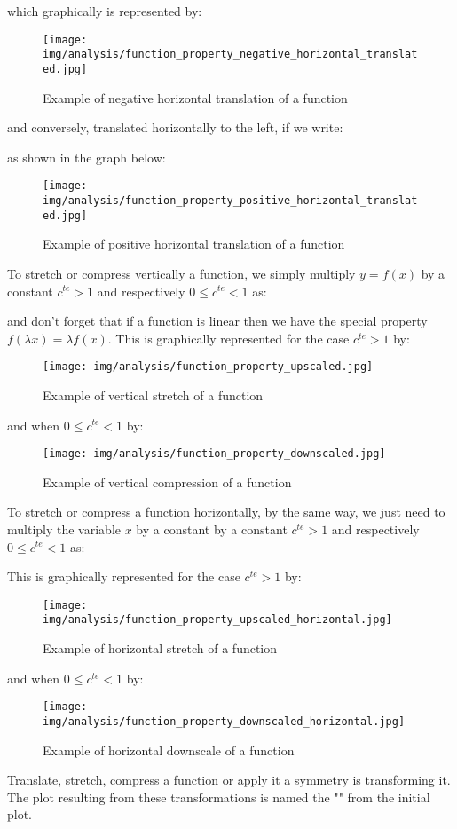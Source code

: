 \begin{enumerate}
		which graphically is represented by:
		\begin{figure}[H]
		\centering
		\texttt{[image: img/analysis/function\_property\_negative\_horizontal\_translated.jpg]}
		\caption{Example of negative horizontal translation of a function}
		\end{figure}
		and conversely, translated horizontally to the left, if we write:
		
			as shown in the graph below:
		\begin{figure}[H]
		\centering
		\texttt{[image: img/analysis/function\_property\_positive\_horizontal\_translated.jpg]}
		\caption{Example of positive horizontal translation of a function}
		\end{figure}
		To stretch or compress vertically a function, we simply multiply $y=f(x)$ by a constant $c^{te}>1$ and respectively $0\leq c^{te}<1$ as:
		
		and don't forget that if a function is linear then we have the special property $f(\lambda x)=\lambda f(x)$.
		This is graphically represented for the case $c^{te}>1$ by:
		\begin{figure}[H]
		\centering
		\texttt{[image: img/analysis/function\_property\_upscaled.jpg]}
		\caption{Example of vertical stretch of a function}
		\end{figure}
		and when $0\leq c^{te}<1$ by:
		\begin{figure}[H]
		\centering
		\texttt{[image: img/analysis/function\_property\_downscaled.jpg]}
		\caption{Example of vertical compression of a function}
		\end{figure}
		To stretch or compress a function horizontally, by the same way, we just need to multiply the variable $x$ by a constant by a constant $c^{te}>1$ and respectively $0\leq c^{te}<1$ as:
		
		This is graphically represented for the case $c^{te}>1$ by:
		\begin{figure}[H]
		\centering
		\texttt{[image: img/analysis/function\_property\_upscaled\_horizontal.jpg]}
		\caption{Example of horizontal stretch of a function}
		\end{figure}
		and when $0\leq c^{te}<1$ by:
		\begin{figure}[H]
			\centering
			\texttt{[image: img/analysis/function\_property\_downscaled\_horizontal.jpg]}
			\caption{Example of horizontal downscale of a function}
		\end{figure}
	\end{enumerate}
	
	\begin{tcolorbox}[title=Remark,colframe=black,arc=10pt]
	Translate, stretch, compress a function or apply it a symmetry is transforming it. The plot resulting from these transformations is named the "" from the initial plot.
	\end{tcolorbox}	
	
